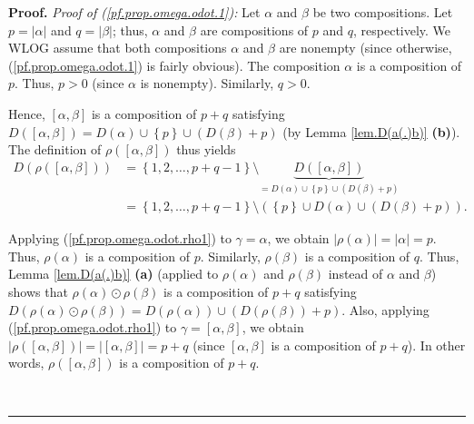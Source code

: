 \documentclass[numbers=enddot,12pt,final,onecolumn,notitlepage,abstracton]{scrartcl}%
\theoremstyle{definition}
\newenvironment{proof}[1][Proof]{\noindent\textbf{#1.} }{\ \rule{0.5em}{0.5em}}
\newenvironment{verlong}{}{}
\begin{document}
\begin{verlong}
\begin{proof}
\textit{Proof of (\ref{pf.prop.omega.odot.1}):} Let $\alpha$ and $\beta$ be
two compositions. Let $p=\left\vert \alpha\right\vert $ and $q=\left\vert
\beta\right\vert $; thus, $\alpha$ and $\beta$ are compositions of $p$ and
$q$, respectively. We WLOG assume that both compositions $\alpha$ and $\beta$
are nonempty (since otherwise, (\ref{pf.prop.omega.odot.1}) is fairly
obvious). The composition $\alpha$ is a composition of $p$. Thus, $p > 0$
(since $\alpha$ is nonempty). Similarly, $q > 0$.

Hence, $\left[  \alpha,\beta\right]  $ is a composition of $p+q$ satisfying
$D\left(  \left[  \alpha,\beta\right]  \right)  =D\left(  \alpha\right)
\cup\left\{  p\right\}  \cup\left(  D\left(  \beta\right)  +p\right)  $ (by
Lemma \ref{lem.D(a(.)b)} \textbf{(b)}). The definition of $\rho\left(  \left[
\alpha,\beta\right]  \right)  $ thus yields%
\begin{align}
D\left(  \rho\left(  \left[  \alpha,\beta\right]  \right)  \right)   &
=\left\{  1,2,\ldots,p+q-1\right\}  \setminus\underbrace{D\left(  \left[
\alpha,\beta\right]  \right)  }_{=D\left(  \alpha\right)  \cup\left\{
p\right\}  \cup\left(  D\left(  \beta\right)  +p\right)  }\nonumber\\
&  =\left\{  1,2,\ldots,p+q-1\right\}  \setminus\left(  \left\{  p\right\}
\cup D\left(  \alpha\right)  \cup\left(  D\left(  \beta\right)  +p\right)
\right)  . \label{pf.prop.omega.odot.1.pf.1}%
\end{align}


Applying (\ref{pf.prop.omega.odot.rho1}) to $\gamma=\alpha$, we obtain
$\left\vert \rho\left(  \alpha\right)  \right\vert =\left\vert \alpha
\right\vert =p$. Thus, $\rho\left(  \alpha\right)  $ is a composition of $p$.
Similarly, $\rho\left(  \beta\right)  $ is a composition of $q$. Thus, Lemma
\ref{lem.D(a(.)b)} \textbf{(a)} (applied to $\rho\left(  \alpha\right)  $ and
$\rho\left(  \beta\right)  $ instead of $\alpha$ and $\beta$) shows that
$\rho\left(  \alpha\right)  \odot\rho\left(  \beta\right)  $ is a composition
of $p+q$ satisfying $D\left(  \rho\left(  \alpha\right)  \odot\rho\left(
\beta\right)  \right)  =D\left(  \rho\left(  \alpha\right)  \right)
\cup\left(  D\left(  \rho\left(  \beta\right)  \right)  +p\right)  $. Also,
applying (\ref{pf.prop.omega.odot.rho1}) to $\gamma=\left[  \alpha
,\beta\right]  $, we obtain $\left|  \rho\left(  \left[  \alpha,\beta\right]
\right)  \right|  = \left|  \left[  \alpha,\beta\right]  \right|  = p+q$
(since $\left[  \alpha,\beta\right]  $ is a composition of $p+q$). In other
words, $\rho\left(  \left[  \alpha,\beta\right]  \right)  $ is a composition
of $p+q$.


\end{proof}
\end{verlong}
\end{document}

